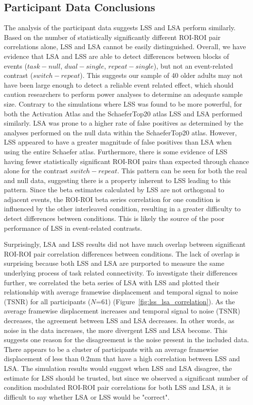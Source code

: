 \documentclass[phd,appendix,figures]{uithesis}
\begin{document}
\subsection*{Participant Data Conclusions}
\label{discussion:taskswitching-conclusions}

The analysis of the participant data suggests LSS and LSA perform similarly.
Based on the number of statistically significantly different ROI-ROI pair correlations alone,
LSS and LSA cannot be easily distinguished.
Overall, we have evidence that LSA and LSS are able to detect differences between
blocks of events ($task - null$, $dual - single$, $repeat - single$), but not an event-related contrast ($switch - repeat$).
This suggests our sample of 40 older adults may not have been large enough to detect a reliable event related effect,
which should caution researchers to perform power analyses to determine an adequate sample size.
Contrary to the simulations where LSS was found to be more powerful,
for both the Activation Atlas and the SchaeferTop20 atlas LSS and LSA performed similarly.
LSA was prone to a higher rate of false positives as determined by the analyses performed on the null data within the SchaeferTop20 atlas.
However, LSS appeared to have a greater magnitude of false positives than LSA when using the entire Schaefer atlas.
Furthermore, there is some evidence of LSS having fewer statistically significant ROI-ROI pairs than expected through chance alone
for the contrast $switch - repeat$.
This pattern can be seen for both the real and null data, suggesting there is a property inherent to LSS
leading to this pattern.
Since the beta estimates calculated by LSS are not orthogonal to adjacent events,
the ROI-ROI beta series correlation for one condition is influenced by the other interleaved condition,
resulting in a greater difficulty to detect differences between conditions.
This is likely the source of the poor performance of LSS in event-related contrasts.

Surprisingly, LSA and LSS results did not have much overlap between significant
ROI-ROI pair correlation differences between conditions.
The lack of overlap is surprising because both LSS and LSA are purported to
measure the same underlying process of task related connectivity.
To investigate their differences further, we correlated the beta series of LSA with LSS and plotted their relationship with
average framewise displacement and temporal signal to noise (TSNR) for all participants ($N$=61) (Figure~\ref{fig:lss_lsa_correlation}).
As the average framewise displacement increases and temporal signal to noise (TSNR)
decreases, the agreement between LSS and LSA decreases.
In other words, as noise in the data increases, the more divergent LSS and LSA become.
This suggests one reason for the disagreement is the noise present in the included
data.
There appears to be a cluster of participants with an average framewise displacement of
less than 0.2mm that have a high correlation between LSS and LSA.
The simulation results would suggest when LSS and LSA disagree, the estimate for LSS should be
trusted, but since we observed a significant number of condition modulated ROI-ROI pair correlations for both
LSS and LSA, it is difficult to say whether LSA or LSS would be "correct".
\end{document}
